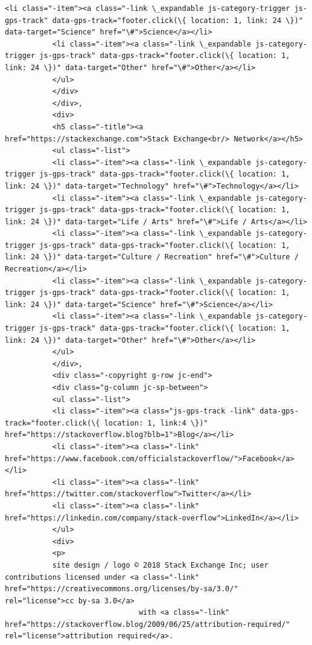 \documentclass[11pt]{article}
\begin{document}
\begin{Verbatim}[commandchars=\\\{\}]
           <li class="-item"><a class="-link \_expandable js-category-trigger js-gps-track" data-gps-track="footer.click(\{ location: 1, link: 24 \})" data-target="Science" href="\#">Science</a></li>
           <li class="-item"><a class="-link \_expandable js-category-trigger js-gps-track" data-gps-track="footer.click(\{ location: 1, link: 24 \})" data-target="Other" href="\#">Other</a></li>
           </ul>
           </div>
           </div>,
           <div>
           <h5 class="-title"><a href="https://stackexchange.com">Stack Exchange<br/> Network</a></h5>
           <ul class="-list">
           <li class="-item"><a class="-link \_expandable js-category-trigger js-gps-track" data-gps-track="footer.click(\{ location: 1, link: 24 \})" data-target="Technology" href="\#">Technology</a></li>
           <li class="-item"><a class="-link \_expandable js-category-trigger js-gps-track" data-gps-track="footer.click(\{ location: 1, link: 24 \})" data-target="Life / Arts" href="\#">Life / Arts</a></li>
           <li class="-item"><a class="-link \_expandable js-category-trigger js-gps-track" data-gps-track="footer.click(\{ location: 1, link: 24 \})" data-target="Culture / Recreation" href="\#">Culture / Recreation</a></li>
           <li class="-item"><a class="-link \_expandable js-category-trigger js-gps-track" data-gps-track="footer.click(\{ location: 1, link: 24 \})" data-target="Science" href="\#">Science</a></li>
           <li class="-item"><a class="-link \_expandable js-category-trigger js-gps-track" data-gps-track="footer.click(\{ location: 1, link: 24 \})" data-target="Other" href="\#">Other</a></li>
           </ul>
           </div>,
           <div class="-copyright g-row jc-end">
           <div class="g-column jc-sp-between">
           <ul class="-list">
           <li class="-item"><a class="js-gps-track -link" data-gps-track="footer.click(\{ location: 1, link:4 \})" href="https://stackoverflow.blog?blb=1">Blog</a></li>
           <li class="-item"><a class="-link" href="https://www.facebook.com/officialstackoverflow/">Facebook</a></li>
           <li class="-item"><a class="-link" href="https://twitter.com/stackoverflow">Twitter</a></li>
           <li class="-item"><a class="-link" href="https://linkedin.com/company/stack-overflow">LinkedIn</a></li>
           </ul>
           <div>
           <p>
           site design / logo © 2018 Stack Exchange Inc; user contributions licensed under <a class="-link" href="https://creativecommons.org/licenses/by-sa/3.0/" rel="license">cc by-sa 3.0</a>
                               with <a class="-link" href="https://stackoverflow.blog/2009/06/25/attribution-required/" rel="license">attribution required</a>.

\end{Verbatim}
\end{document}
